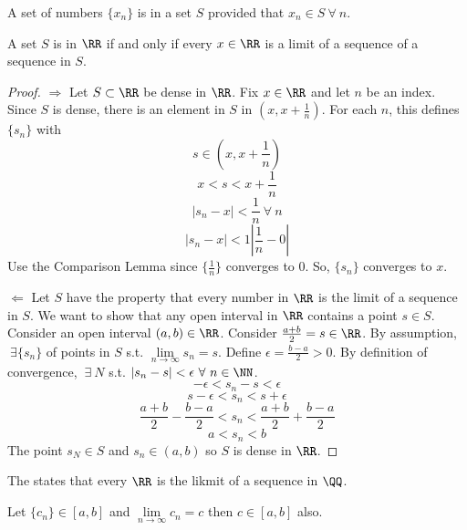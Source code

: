 \documentclass[12pt]{scrartcl}
\begin{document}
\begin{definition}
  A set of numbers $\{x_n\}$ is in a set $S$ provided that $x_n \in S \ \forall \ n$.
\end{definition}

\begin{lemma}
  A set $S$ is  in $\RR$ if and only if every $x \in \RR$ is a limit of a sequence of a 
  sequence in $S$. 
  
  \begin{proof}
    
    \hfill

    $\Longrightarrow$ Let $S \subset \RR$ be dense in $\RR$. Fix $x \in \RR$ and let $n$ be an index. 
    Since $S$ is dense, there is an element in $S$ in $(x, x + \frac{1}{n})$. For each $n$, this 
    defines $\{s_n\}$ with 
    \[s \in (x, x + \frac{1}{n})\]
    \[x < s < x + \frac{1}{n}\]
    \[|s_n - x| < \frac{1}{n} \ \forall \ n\]
    \[|s_n - x| < 1|\frac{1}{n} - 0|\]
    Use the Comparison Lemma since $\{\frac{1}{n}\}$ converges to $0$. So, $\{s_n\}$ converges to $x$. 
    
    \hfill

    $\Longleftarrow$ Let $S$ have the property that every number in $\RR$ is the limit of a sequence in 
    $S$. We want to show that any open interval in $\RR$ contains a point $s \in S$. 
    Consider an open interval $(a, b) \in \RR$. Consider $\frac{a + b}{2} = s \in \RR$. 
    By assumption, $\ \exists \{s_n\}$ of points in $S$ s.t. $\underset{n\to\infty}{\lim}s_n = s$.
    Define $\epsilon = \frac{b - a}{2} > 0$. 
    By definition of convergence, $\ \exists \ N$ s.t. $|s_n - s| < \epsilon \ \forall \ n \in \NN$. 
    \[-\epsilon < s_n - s < \epsilon\]
    \[s - \epsilon < s_n < s + \epsilon\]
    \[\frac{a+b}{2} - \frac{b-a}{2} < s_n < \frac{a+b}{2} + \frac{b-a}{2}\]
    \[a < s_n < b\]
    The point $s_N \in S$ and $s_n \in (a, b)$ so $S$ is dense in $\RR$. 

  \end{proof}
\end{lemma}

\begin{definition}
  The  states that every $\RR$ is the likmit of a sequence in 
  $\QQ$. 
\end{definition}

\begin{theorem}
  Let $\{c_n\} \in [a, b]$ and $\underset{n\to\infty}{\lim}c_n = c$ then $c \in [a, b]$ also. 
\end{theorem}
\end{document}
